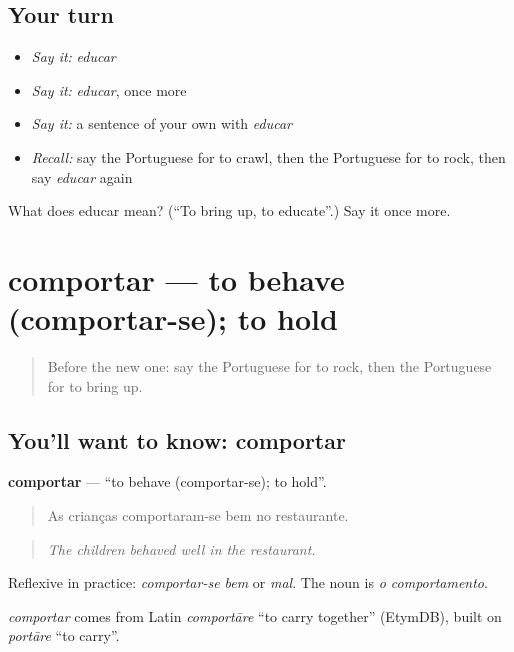 \subsection*{Your turn}
\begin{itemize}
\raggedright
  \item \emph{Say it:} \emph{educar}
  \item \emph{Say it:} \emph{educar}, once more
  \item \emph{Say it:} a sentence of your own with \emph{educar}
  \item \emph{Recall:} say the Portuguese for to crawl, then the Portuguese for to rock, then say \emph{educar} again
\end{itemize}

\begin{tcolorbox}[breakable,colback=teal!4,colframe=teal!35!black,title={Before you move on}]
What does educar mean? (\textquotedblleft{}To bring up, to educate\textquotedblright{}.) Say it once more.
\end{tcolorbox}
\section[comportar]{comportar — to behave (comportar-se); to hold}

\label{lesson:PT-C495-comportar}



\begin{quote}
Before the new one: say the Portuguese for to rock, then the Portuguese for to bring up.
\end{quote}

\subsection*{You'll want to know: comportar}
\textbf{comportar} — \textquotedblleft{}to behave (comportar-se); to hold\textquotedblright{}.

\begin{quote}
As crianças comportaram-se bem no restaurante.
\end{quote}

\begin{quote}
\emph{The children behaved well in the restaurant.}
\end{quote}

Reflexive in practice: \emph{comportar-se bem} or \emph{mal}. The noun is \emph{o comportamento}.

\begin{cousinweb}
\emph{comportar} comes from Latin \emph{comportāre} \textquotedblleft{}to carry together\textquotedblright{} (EtymDB), built on \emph{portāre} \textquotedblleft{}to carry\textquotedblright{}.
\end{cousinweb}

